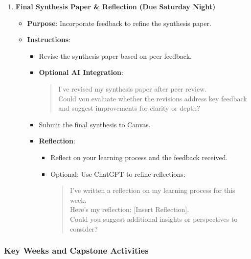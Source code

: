 \documentclass[11pt, letterpaper]{article}
\begin{document}
\begin{enumerate}
    \item \textbf{Final Synthesis Paper \& Reflection (Due Saturday Night)}
    \begin{itemize}
        \item \textbf{Purpose}: Incorporate feedback to refine the synthesis paper.
        \item \textbf{Instructions}:
        \begin{itemize}
            \item Revise the synthesis paper based on peer feedback.
            \item \textbf{Optional AI Integration}:
            \begin{quote}
                I’ve revised my synthesis paper after peer review. \\ 
                Could you evaluate whether the revisions address key feedback and suggest improvements for clarity or depth?
            \end{quote}
            \item Submit the final synthesis to Canvas.
            \item \textbf{Reflection}:
            \begin{itemize}
                \item Reflect on your learning process and the feedback received.
                \item Optional: Use ChatGPT to refine reflections:
                \begin{quote}
                    I’ve written a reflection on my learning process for this week. \\ 
                    Here’s my reflection: [Insert Reflection]. \\ 
                    Could you suggest additional insights or perspectives to consider?
                \end{quote}
            \end{itemize}
        \end{itemize}
    \end{itemize}
\end{enumerate}

\subsubsection*{Key Weeks and Capstone Activities}
\end{document}
